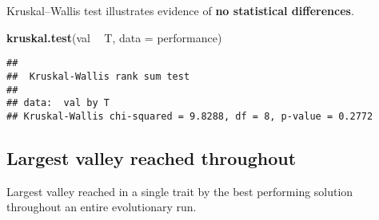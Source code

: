 \documentclass[]{book}
\newenvironment{Shaded}{\begin{snugshade}}{\end{snugshade}}
\newcommand{\DataTypeTok}[1]{\textcolor[rgb]{0.13,0.29,0.53}{#1}}
\newcommand{\KeywordTok}[1]{\textcolor[rgb]{0.13,0.29,0.53}{\textbf{#1}}}
\newcommand{\NormalTok}[1]{#1}
\newcommand{\OperatorTok}[1]{\textcolor[rgb]{0.81,0.36,0.00}{\textbf{#1}}}
\newcommand{\StringTok}[1]{\textcolor[rgb]{0.31,0.60,0.02}{#1}}
\begin{document}
Kruskal--Wallis test illustrates evidence of \textbf{no statistical differences}.

\begin{Shaded}
\begin{Highlighting}[]
\KeywordTok{kruskal.test}\NormalTok{(val }\OperatorTok{~}\StringTok{ }\NormalTok{T, }\DataTypeTok{data =}\NormalTok{ performance)}
\end{Highlighting}
\end{Shaded}

\begin{verbatim}
## 
##  Kruskal-Wallis rank sum test
## 
## data:  val by T
## Kruskal-Wallis chi-squared = 9.8288, df = 8, p-value = 0.2772
\end{verbatim}

\hypertarget{largest-valley-reached-throughout-7}{%
\subsection{Largest valley reached throughout}\label{largest-valley-reached-throughout-7}}

Largest valley reached in a single trait by the best performing solution throughout an entire evolutionary run.
\end{document}
